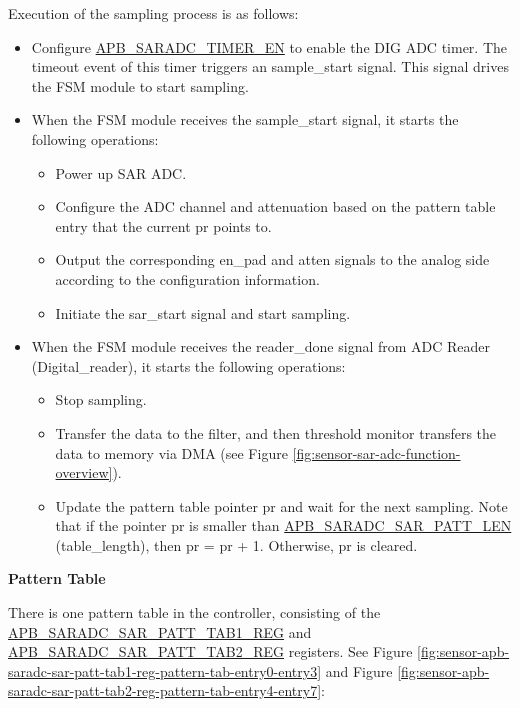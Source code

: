 \documentclass[main\_\_EN.tex]{subfiles}
\begin{document}
Execution of the sampling process is as follows:
\begin{itemize}
\item Configure \hyperref[fielddesc:APBSARADCTIMEREN]{APB\_SARADC\_TIMER\_EN} to enable the DIG ADC timer. The timeout event of this timer triggers an sample\_start signal. This signal drives the FSM module to start sampling.
\item When the FSM module receives the sample\_start signal, it starts the following operations:
\begin{itemize}
    \item Power up SAR ADC.
    \item Configure the ADC channel and attenuation based on the pattern table entry that the current pr points to.
    \item Output the corresponding en\_pad and atten signals to the analog side according to the configuration information.
    \item Initiate the sar\_start signal and start sampling.
\end{itemize}
    \item When the FSM module receives the reader\_done signal from ADC Reader (Digital\_reader), it starts the following operations:
    \begin{itemize}
        \item Stop sampling.
        \item Transfer the data to the filter, and then threshold monitor transfers the data to memory via DMA (see Figure \ref{fig:sensor-sar-adc-function-overview}).
        \item Update the pattern table pointer pr and wait for the next sampling. Note that if the pointer pr is smaller than \hyperref[fielddesc:APBSARADCSARPATTLEN]{APB\_SARADC\_SAR\_PATT\_LEN} (table\_length), then pr = pr + 1. Otherwise, pr is cleared.
    \end{itemize}
\end{itemize}    
    

\textbf{Pattern Table}

There is one pattern table in the controller, consisting of the \hyperref[regdesc:APBSARADCSARPATTTAB1REG]{APB\_SARADC\_SAR\_PATT\_TAB1\_REG} and \hyperref[regdesc:APBSARADCSARPATTTAB1REG]{APB\_SARADC\_SAR\_PATT\_TAB2\_REG} registers. See Figure \ref{fig:sensor-apb-saradc-sar-patt-tab1-reg-pattern-tab-entry0-entry3} and Figure \ref{fig:sensor-apb-saradc-sar-patt-tab2-reg-pattern-tab-entry4-entry7}:
\end{document}
